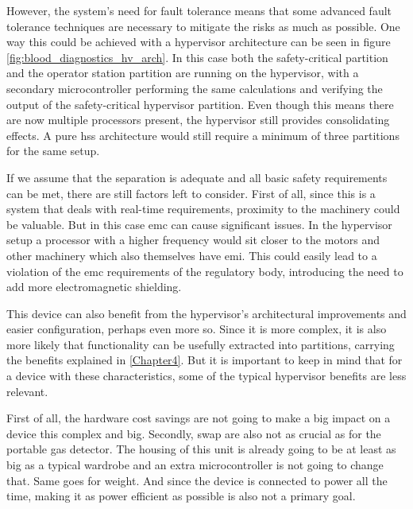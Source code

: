 However, the system's need for fault tolerance means that some advanced fault tolerance techniques are necessary to mitigate the risks as much as possible. One way this could be achieved with a hypervisor architecture can be seen in figure \ref{fig:blood_diagnostics_hv_arch}. In this case both the safety-critical partition and the operator station partition are running on the hypervisor, with a secondary microcontroller performing the same calculations and verifying the output of the safety-critical hypervisor partition. Even though this means there are now multiple processors present, the hypervisor still provides consolidating effects. A pure \acrshort{hss} architecture would still require a minimum of three partitions for the same setup.

If we assume that the separation is adequate and all basic safety requirements can be met, there are still factors left to consider. First of all, since this is a system that deals with real-time requirements, proximity to the machinery could be valuable. But in this case \acrshort{emc} can cause significant issues. In the hypervisor setup a processor with a higher frequency would sit closer to the motors and other machinery which also themselves have \acrshort{emi}. This could easily lead to a violation of the \acrshort{emc} requirements of the regulatory body, introducing the need to add more electromagnetic shielding. 

This device can also benefit from the hypervisor's architectural improvements and easier configuration, perhaps even more so. Since it is more complex, it is also more likely that functionality can be usefully extracted into partitions, carrying the benefits explained in \ref{Chapter4}. But it is important to keep in mind that for a device with these characteristics, some of the typical hypervisor benefits are less relevant.

First of all, the hardware cost savings are not going to make a big impact on a device this complex and big. Secondly, \acrshort{swap} are also not as crucial as for the portable gas detector. The housing of this unit is already going to be at least as big as a typical wardrobe and an extra microcontroller is not going to change that. Same goes for weight. And since the device is connected to power all the time, making it as power efficient as possible is also not a primary goal.


